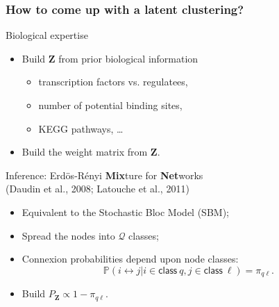 
  

\begin{frame}
  \frametitle{How to come up with a latent clustering?}
  
  \begin{block}{Biological expertise}
    \begin{itemize}
    \item Build $\mathbf{Z}$ from prior biological information 
      \begin{itemize}
      \item transcription factors vs. regulatees,
      \item number of potential binding sites,
      \item KEGG pathways, \dots
      \end{itemize}
    \item Build the weight matrix from $\mathbf{Z}$.
    \end{itemize}
  \end{block}
  
  \vfill
  
  \begin{block}{Inference: Erdös-Rényi  \textbf{Mix}ture for
      \textbf{Net}works \\ \small{(Daudin et al., 2008; Latouche et al., 2011)}} 
    \begin{itemize}
    \item Equivalent to the Stochastic Bloc Model (SBM);
    \item    Spread the  nodes into $\mathcal{Q}$ classes;
    \item Connexion probabilities depend upon node classes:
      \begin{equation*}
        \mathbb{P} (i \leftrightarrow j|i \in \mathsf{ class}\ q, j \in
        \mathsf{ class }\ \ell) = \pi_{q \ell}.
      \end{equation*}
    \item Build $P_{\mathbf{Z}} \propto 1-\pi_{q\ell}$.
    \end{itemize}
   \end{block}
\end{frame}

